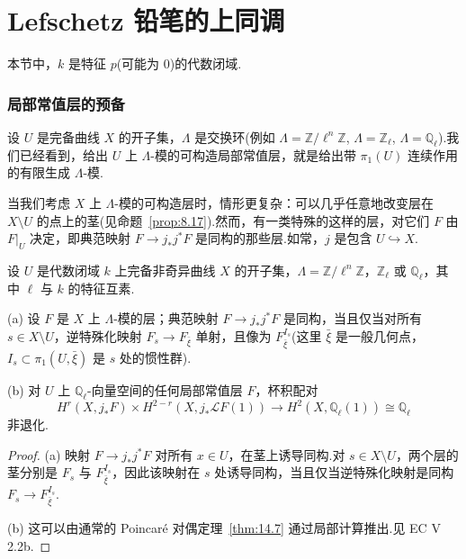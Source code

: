 ﻿%
\chapter{Lefschetz 铅笔的上同调}\label{sec:32}

本节中，$k$ 是特征 $p$(可能为 0)的代数闭域.

\subsection*{局部常值层的预备}

设 $U$ 是完备曲线 $X$ 的开子集，$\Lambda$ 是交换环(例如 $\Lambda = \mathbb{Z}/\ell^{n}\mathbb{Z}$, $\Lambda = \mathbb{Z}_{\ell}$, $\Lambda = \mathbb{Q}_{\ell}$).我们已经看到，给出 $U$ 上 $\Lambda$-模的可构造局部常值层，就是给出带 $\pi_1(U)$ 连续作用的有限生成 $\Lambda$-模.

当我们考虑 $X$ 上 $\Lambda$-模的可构造层时，情形更复杂：可以几乎任意地改变层在 $X \setminus U$ 的点上的茎(见命题~\ref{prop:8.17}).然而，有一类特殊的这样的层，对它们 $F$ 由 $F|_{U}$ 决定，即典范映射 $F \to j_{*}j^{*}F$ 是同构的那些层.如常，$j$ 是包含 $U \hookrightarrow X$.

\begin{proposition}\label{prop:32.1}
设 $U$ 是代数闭域 $k$ 上完备非奇异曲线 $X$ 的开子集，$\Lambda = \mathbb{Z}/\ell^{n}\mathbb{Z}$，$\mathbb{Z}_{\ell}$ 或 $\mathbb{Q}_{\ell}$，其中 $\ell$ 与 $k$ 的特征互素.

(a) 设 $F$ 是 $X$ 上 $\Lambda$-模的层；典范映射 $F \to j_{*}j^{*}F$ 是同构，当且仅当对所有 $s \in X \setminus U$，逆特殊化映射 $F_s \to F_{\bar{\xi}}$ 单射，且像为 $F^{I_s}_{\bar{\xi}}$(这里 $\bar{\xi}$ 是一般几何点，$I_s \subset \pi_1(U, \bar{\xi})$ 是 $s$ 处的惯性群).

(b) 对 $U$ 上 $\mathbb{Q}_{\ell}$-向量空间的任何局部常值层 $F$，杯积配对
\[
H^{r}(X, j_{*}F) \times H^{2-r}(X, j_{*}\mathcal{L}F(1)) \to H^{2}(X, \mathbb{Q}_{\ell}(1)) \cong \mathbb{Q}_{\ell}
\]
非退化.
\end{proposition}

\begin{proof}
(a) 映射 $F \to j_{*}j^{*}F$ 对所有 $x \in U$，在茎上诱导同构.对 $s \in X \setminus U$，两个层的茎分别是 $F_s$ 与 $F^{I_s}_{\bar{\xi}}$，因此该映射在 $s$ 处诱导同构，当且仅当逆特殊化映射是同构 $F_s \to F^{I_s}_{\bar{\xi}}$.

(b) 这可以由通常的 Poincar\'e 对偶定理~\ref{thm:14.7} 通过局部计算推出.见 EC V 2.2b.
\end{proof}

